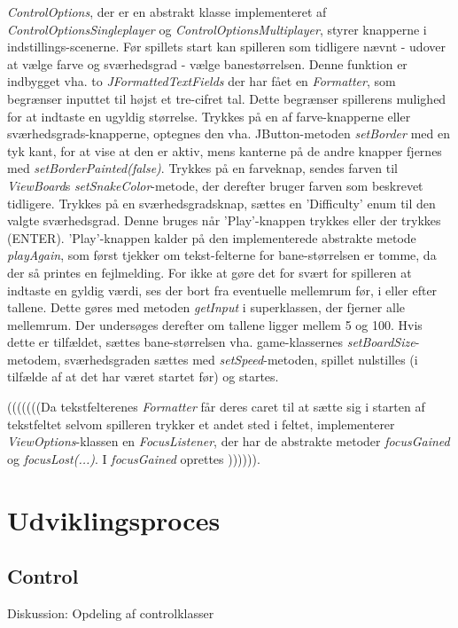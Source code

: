 \textit{ControlOptions}, der er en abstrakt klasse implementeret af \textit{ControlOptionsSingleplayer} og \textit{ControlOptionsMultiplayer}, styrer knapperne i indstillings-scenerne. Før spillets start kan spilleren som tidligere nævnt - udover at vælge farve og sværhedsgrad - vælge banestørrelsen. Denne funktion er indbygget vha. to \textit{JFormattedTextFields} der har fået en \textit{Formatter}, som begrænser inputtet til højst et tre-cifret tal. Dette begrænser spillerens mulighed for at indtaste en ugyldig størrelse. Trykkes på en af farve-knapperne eller sværhedsgrads-knapperne, optegnes den vha. JButton-metoden \textit{setBorder} med en tyk kant, for at vise at den er aktiv, mens kanterne på de andre knapper fjernes med \textit{setBorderPainted(false)}. Trykkes på en farveknap, sendes farven til \textit{ViewBoard}s \textit{setSnakeColor}-metode, der derefter bruger farven som beskrevet tidligere. Trykkes på en sværhedsgradsknap, sættes  en 'Difficulty' enum til den valgte sværhedsgrad. Denne bruges når 'Play'-knappen trykkes eller der trykkes (ENTER). 'Play'-knappen kalder på den implementerede abstrakte metode \textit{playAgain}, som først tjekker om tekst-felterne for bane-størrelsen er tomme, da der så printes en fejlmelding. For ikke at gøre det for svært for spilleren at indtaste en gyldig værdi, ses der bort fra eventuelle mellemrum før, i eller efter tallene. Dette gøres med metoden \textit{getInput} i superklassen, der fjerner alle mellemrum. Der undersøges derefter om tallene ligger mellem 5 og 100. Hvis dette er tilfældet, sættes bane-størrelsen vha. game-klassernes \textit{setBoardSize}-metodem, sværhedsgraden sættes med \textit{setSpeed}-metoden, spillet nulstilles (i tilfælde af at det har været startet før) og startes.

(((((((Da tekstfelterenes \textit{Formatter} får deres caret til at sætte sig i starten af tekstfeltet selvom spilleren trykker et andet sted i feltet, implementerer \textit{ViewOptions}-klassen en \textit{FocusListener}, der har de abstrakte metoder \textit{focusGained} og \textit{focusLost(...)}. I \textit{focusGained} oprettes )))))).

\section{Udviklingsproces}
\subsection{Control}
Diskussion: Opdeling af controlklasser

